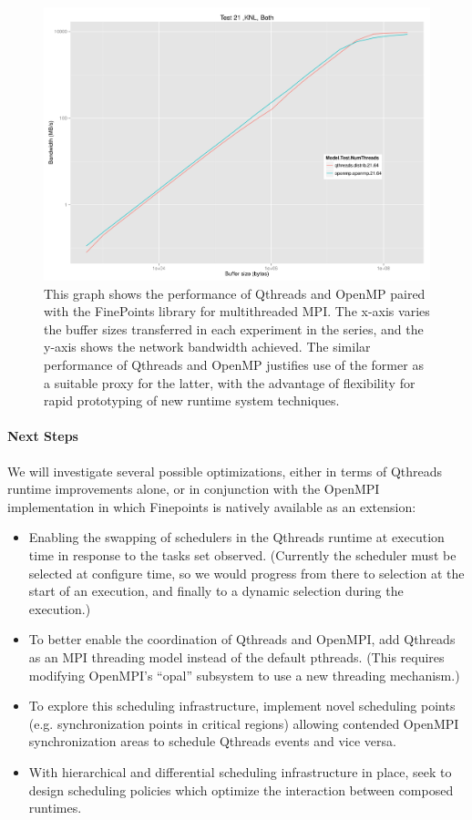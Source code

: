 \begin{figure}[htb]
	\centering
	\includegraphics[width=6in]{projects/2.3.1-PMR/2.3.1.15-Qthreads/FinePointsBW-QtOmp.pdf}
	\caption{\label{fig:qthreads-finepoints-graph}This graph shows the performance of Qthreads and OpenMP paired with the FinePoints library for multithreaded MPI.  The x-axis varies the buffer sizes transferred in each experiment in the series, and the y-axis shows the network bandwidth achieved.  The similar performance of Qthreads and OpenMP justifies use of the former as a suitable proxy for the latter, with the advantage of flexibility for rapid prototyping of new runtime system techniques.}
\end{figure}


\paragraph{Next Steps}

We will investigate several possible optimizations, either in terms of Qthreads runtime improvements alone, or in conjunction with the OpenMPI implementation in which Finepoints is natively available as an extension:

\begin{itemize}
\item Enabling the swapping of schedulers in the Qthreads runtime at execution time in response to the tasks set observed.  (Currently the scheduler must be selected at configure time, so we would progress from there to selection at the start of an execution, and finally to a dynamic selection during the execution.)
\item To better enable the coordination of Qthreads and OpenMPI, add Qthreads as an MPI threading model instead of the default pthreads. (This requires modifying OpenMPI's “opal” subsystem to use a new threading mechanism.)
\item To explore this scheduling infrastructure, implement novel scheduling points (e.g. synchronization points in critical regions) allowing contended OpenMPI synchronization areas to schedule Qthreads events and vice versa.
\item With hierarchical and differential scheduling infrastructure in place, seek to design scheduling policies which optimize the interaction between composed runtimes.
\end{itemize}

